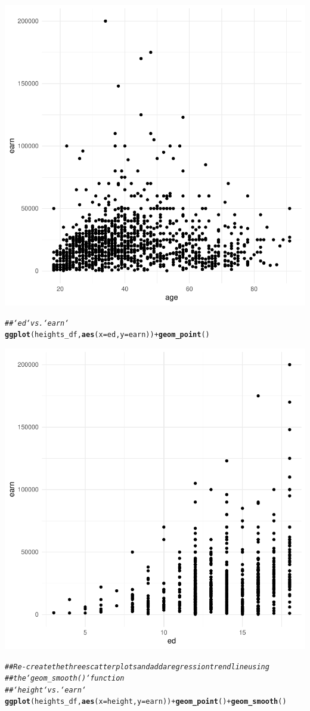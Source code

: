 \documentclass{article}\usepackage[]{graphicx}\usepackage[]{xcolor}
\makeatletter
\newcommand{\hlcom}[1]{\textcolor[rgb]{0.678,0.584,0.686}{\textit{#1}}}%
\newcommand{\hlopt}[1]{\textcolor[rgb]{0,0,0}{#1}}%
\newcommand{\hlstd}[1]{\textcolor[rgb]{0.345,0.345,0.345}{#1}}%
\newcommand{\hlkwc}[1]{\textcolor[rgb]{0.333,0.667,0.333}{#1}}%
\newcommand{\hlkwd}[1]{\textcolor[rgb]{0.737,0.353,0.396}{\textbf{#1}}}%
\newenvironment{kframe}{%
 \def\at@end@of@kframe{}%
 \ifinner\ifhmode%
  \def\at@end@of@kframe{\end{minipage}}%
  \begin{minipage}{\columnwidth}%
 \fi\fi%
 \def\FrameCommand##1{\hskip\@totalleftmargin \hskip-\fboxsep
 \colorbox{shadecolor}{##1}\hskip-\fboxsep
     \hskip-\linewidth \hskip-\@totalleftmargin \hskip\columnwidth}%
 \MakeFramed {\advance\hsize-\width
   \@totalleftmargin\z@ \linewidth\hsize
   \@setminipage}}%
 {\par\unskip\endMakeFramed%
 \at@end@of@kframe}
\newenvironment{knitrout}{}{} %
\makeatother
\begin{document}
\begin{knitrout}
{\centering \includegraphics[width=.6\linewidth]{figure/assignment-03-TangXin-Rnwauto-report-2} 

}


\begin{kframe}\begin{alltt}
\hlcom{## `ed` vs. `earn`}
\hlkwd{ggplot}\hlstd{(heights_df,} \hlkwd{aes}\hlstd{(}\hlkwc{x}\hlstd{=ed,} \hlkwc{y}\hlstd{=earn))} \hlopt{+} \hlkwd{geom_point}\hlstd{()}
\end{alltt}
\end{kframe}

{\centering \includegraphics[width=.6\linewidth]{figure/assignment-03-TangXin-Rnwauto-report-3} 

}


\begin{kframe}\begin{alltt}
\hlcom{## Re-create the three scatterplots and add a regression trend line using}
\hlcom{## the `geom_smooth()` function}
\hlcom{## `height` vs. `earn`}
\hlkwd{ggplot}\hlstd{(heights_df,} \hlkwd{aes}\hlstd{(}\hlkwc{x}\hlstd{=height,} \hlkwc{y}\hlstd{=earn))} \hlopt{+} \hlkwd{geom_point}\hlstd{()} \hlopt{+} \hlkwd{geom_smooth}\hlstd{()}
\end{alltt}



\end{kframe}
\end{knitrout}
\end{document}
